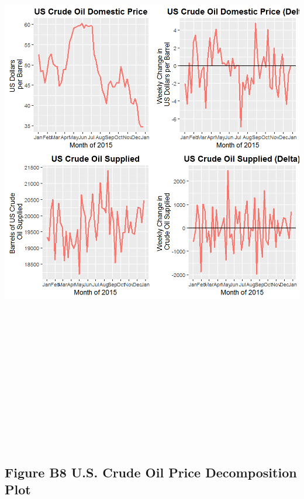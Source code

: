 \documentclass[]{article}
\begin{document}
\includegraphics[height=10.41667in]{images/EIAdata_us_crudeoil_pricesupply.png}

\newpage

\subsection{Figure B8 U.S. Crude Oil Price Decomposition
Plot}\label{figure-b8-u.s.-crude-oil-price-decomposition-plot}
\end{document}
